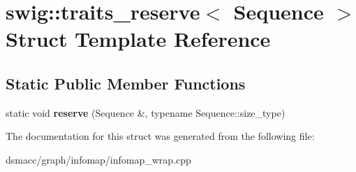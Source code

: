 \hypertarget{structswig_1_1traits__reserve}{}\section{swig\+:\+:traits\+\_\+reserve$<$ Sequence $>$ Struct Template Reference}
\label{structswig_1_1traits__reserve}
\subsection*{Static Public Member Functions}
\begin{DoxyCompactItemize}
\item 
\mbox{\label{structswig_1_1traits__reserve_ab18d7d0017918873e958b9745c0d2709}} 
static void {\bfseries reserve} (Sequence \&, typename Sequence\+::size\+\_\+type)
\end{DoxyCompactItemize}


The documentation for this struct was generated from the following file\+:\begin{DoxyCompactItemize}
\item 
dsmacc/graph/infomap/infomap\+\_\+wrap.\+cpp\end{DoxyCompactItemize}
